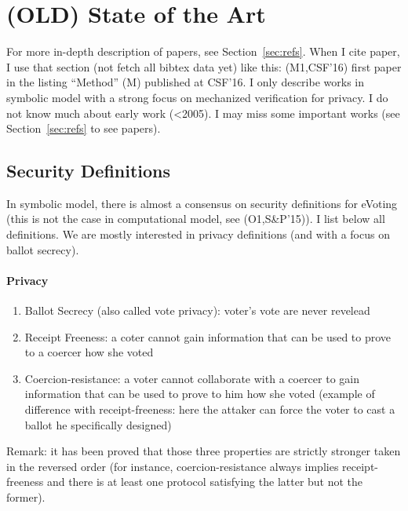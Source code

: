 \section{(OLD) State of the Art}
For more in-depth description of papers, see Section~\ref{sec:refs}. When I cite paper, I use that section
(not fetch all bibtex data yet) like this: (M1,CSF'16) first  paper in the listing ``Method'' (M) published at CSF'16.
I only describe works in symbolic model with a strong focus on mechanized verification for privacy.
I do not know much about early work (<2005).
I may miss some important works (see Section~\ref{sec:refs} to see papers).



\subsection{Security Definitions}
In symbolic model, there is almost a consensus on security definitions for eVoting (this is not the case in computational model, see (O1,S\&P'15)).
I list below all definitions. We are mostly interested in privacy definitions (and with a focus on ballot secrecy).

\paragraph*{Privacy}
\begin{enumerate}
\item Ballot Secrecy (also called vote privacy): voter's vote are never revelead
\item Receipt Freeness: a coter cannot gain information that can be used to prove to a coercer how she voted
\item Coercion-resistance: a voter cannot collaborate with a coercer to gain information that can be used to prove to him how she voted
  (example of difference with receipt-freeness: here the attaker can force the voter to cast a ballot he specifically designed)
\end{enumerate}
Remark: it has been proved that those three properties are strictly stronger taken in the reversed order (for instance, coercion-resistance
always implies receipt-freeness and there is at least one protocol satisfying the latter but not the former).

